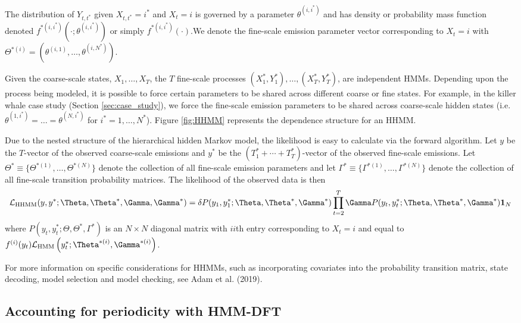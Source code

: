 The distribution of $Y_{t, t^*}$ given $X_{t, t^*}=i^*$ and $X_t=i$ is governed by a parameter $\theta^{(i,i^*)}$ and has density or probability mass function denoted $f^{*(i,i^*)}\left(\cdot; \theta^{(i,i^*)}\right)$ or simply $f^{*(i,i^*)}(\cdot)$.We denote the fine-scale emission parameter vector corresponding to $X_t=i$ with $\Theta^{*(i)}=\left(\theta^{(i,1)}, \ldots, \theta^{(i,N^*)}\right)$.

Given the coarse-scale states, $X_1,\ldots, X_T$, the $T$ fine-scale processes $(X_1^*, Y_1^*), \ldots, (X_T^*, Y_T^*)$, are independent HMMs. Depending upon the process being modeled, it is possible to force certain parameters to be shared across different coarse or fine states. For example, in the killer whale case study (Section \ref{sec:case_study}), we force the fine-scale emission parameters to be shared across coarse-scale hidden states (i.e. $\theta^{(1,i^*)} = \ldots = \theta^{(N,i^*)}$ for $i^* = 1, \ldots, N^*$). Figure \ref{fig:HHMM} represents the dependence structure for an HHMM.

Due to the nested structure of the hierarchical hidden Markov model, the likelihood is easy to calculate via the forward algorithm.
%
Let $y$ be the $T$-vector of the observed coarse-scale emissions and
$y^*$ be the $(T_1^* + \cdots + T_T^*)$-vector of the observed fine-scale emissions.
%
Let $\Theta^* \equiv \{\Theta^{*(1)}, \ldots, \Theta^{*(N)}\}$ denote the collection of all fine-scale emission parameters and let $\Gamma^* \equiv \{\Gamma^{*(1)}, \ldots, \Gamma^{*(N)}\}$ denote the collection of all fine-scale transition probability matrices. The likelihood of the observed data is then
%
\[
\calL_{\text{HHMM}}(y,y^*;\Theta,\Theta^*,\Gamma,\Gamma^*) = \delta P(y_1,y_1^*;\Theta,\Theta^*,\Gamma^*) \prod_{t=2}^T \Gamma P(y_t,y_t^*;\Theta,\Theta^*,\Gamma^*) \mathbf{1}_N
\]
%
where $P(y_t,y_t^*;\Theta,\Theta^*,\Gamma^*)$ is an $N \times N$ diagonal matrix with $ii$th entry corresponding to $X_t=i$ and equal to 
$f^{(i)}(y_t)\calL_{\text{HMM}}\left(y_t^*;\Theta^{*(i)},
\Gamma^{*(i)}\right)$. 

For more information on specific considerations for HHMMs, such as incorporating covariates into the probability transition matrix, state decoding, model selection and model checking, see Adam et al. (2019).

\subsection{Accounting for periodicity with HMM-DFT}
\label{subsec:STFT}

